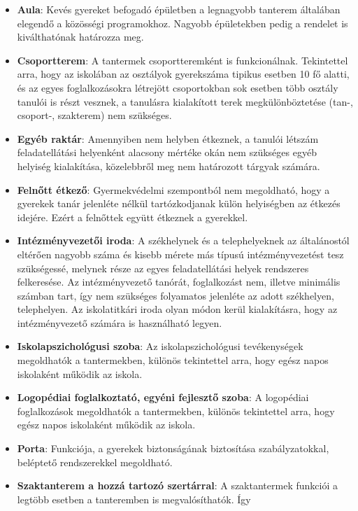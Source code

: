 \begin{itemize}
\tightlist
\item
  \textbf{Aula}: Kevés gyereket befogadó épületben a legnagyobb tanterem
  általában elegendő a közösségi programokhoz. Nagyobb épületekben pedig
  a rendelet is kiválthatónak határozza meg.
\item
  \textbf{Csoportterem}: A tantermek csoportteremként is funkcionálnak.\break
  Tekintettel arra, hogy az iskolában az osztályok gyerekszáma tipikus
  esetben 10 fő alatti, és az egyes foglalkozásokra létrejött
  csoportokban sok esetben több osztály tanulói is részt vesznek, a
  tanulásra kialakított terek megkülönböztetése (tan-, csoport-,
  szakterem) nem szükséges.
\item
  \textbf{Egyéb raktár}: Amennyiben nem helyben étkeznek, a tanulói
  létszám feladatellátási helyenként alacsony mértéke okán nem szükséges
  egyéb helyiség kialakítása, közelebbről meg nem határozott tárgyak
  számára.
\item
  \textbf{Felnőtt étkező}: Gyermekvédelmi szempontból nem megoldható,\break     
  hogy a gyerekek tanár jelenléte nélkül tartózkodjanak külön
  helyiségben az étkezés idejére. Ezért a felnőttek együtt étkeznek a
  gyerekkel.
\item
  \textbf{Intézményvezetői iroda}: A székhelynek és a telephelyeknek az
  általánostól eltérően nagyobb száma és kisebb mérete más típusú
  intézményvezetést tesz szükségessé, melynek része az egyes
  feladatellátási helyek rendszeres felkeresése. Az intézményvezető
  tanórát, foglalkozást nem, illetve minimális számban tart, így nem
  szükséges folyamatos jelenléte az adott székhelyen, telephelyen. Az
  iskolatitkári iroda olyan módon kerül kialakításra, hogy az
  intézményvezető számára is használható legyen.
\item
  \textbf{Iskolapszichológusi szoba}: Az iskolapszichológusi
  tevékenységek megoldhatók a tantermekben, különös tekintettel arra,
  hogy egész napos iskolaként működik az iskola.
\item
  \textbf{Logopédiai foglalkoztató, egyéni fejlesztő szoba}: A
  logopédiai foglalkozások megoldhatók a tantermekben, különös
  tekintettel arra, hogy egész napos iskolaként működik az iskola.
\item
  \textbf{Porta}: Funkciója, a gyerekek biztonságának biztosítása
  szabályzatokkal, beléptető rendszerekkel megoldható.
\item
  \textbf{Szaktanterem a hozzá tartozó szertárral}: A szaktantermek
  funkciói a legtöbb esetben a tanteremben is megvalósíthatók. Így

\end{itemize}
